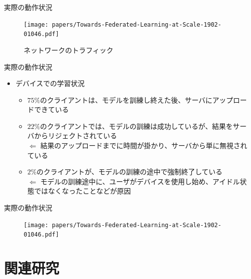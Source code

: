 \documentclass[dvipdfmx,notheorems,t]{beamer}
\begin{document}
\begin{frame}{実際の動作状況}

\begin{figure}
	\centering
	\texttt{[image: papers/Towards-Federated-Learning-at-Scale-1902-01046.pdf]}
	\caption{ネットワークのトラフィック~\cite{1902.01046}}
	\label{fig:server-network-traffic}
\end{figure}

\end{frame}

\begin{frame}{実際の動作状況}

\begin{itemize}
	\item デバイスでの学習状況
	\begin{itemize}
		\item $75\%$のクライアントは、モデルを訓練し終えた後、サーバにアップロードできている
		\newline
		
		\item $22\%$のクライアントでは、モデルの訓練は成功しているが、結果をサーバからリジェクトされている \\
		$\Leftarrow$ 結果のアップロードまでに時間が掛かり、サーバから単に無視されている
		\newline
		
		\item $2\%$のクライアントが、モデルの訓練の途中で強制終了している \\
		$\Leftarrow$ モデルの訓練途中に、ユーザがデバイスを使用し始め、アイドル状態ではなくなったことなどが原因
	\end{itemize}
\end{itemize}

\end{frame}

\begin{frame}{実際の動作状況}

\begin{figure}
	\centering
	\texttt{[image: papers/Towards-Federated-Learning-at-Scale-1902-01046.pdf]}
	\label{fig:on-device-training-round-sessions}
\end{figure}

\end{frame}

\section{関連研究}
\end{document}
